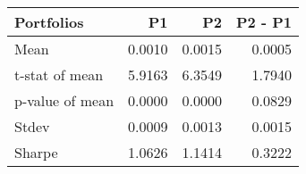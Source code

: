 \begin{tabular}{lrrr}
\toprule
Portfolios & P1 & P2 & P2 - P1 \\
\midrule
Mean & 0.0010 & 0.0015 & 0.0005 \\
t-stat of mean & 5.9163 & 6.3549 & 1.7940 \\
p-value of mean & 0.0000 & 0.0000 & 0.0829 \\
Stdev & 0.0009 & 0.0013 & 0.0015 \\
Sharpe & 1.0626 & 1.1414 & 0.3222 \\
\bottomrule
\end{tabular}
